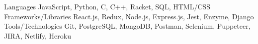 
\begin{cvskills}
  \cvskill
    {Languages} %
    {JavaScript, Python, C, C++, Racket, SQL, HTML/CSS} %
  \cvskill
    {Frameworks/Libraries} %
    {React.js, Redux, Node.js, Express.js, Jest, Enzyme, Django} %
  \cvskill
    {Tools/Technologies} %
    {Git, PostgreSQL, MongoDB, Postman, Selenium, Puppeteer, JIRA, Netlify, Heroku} %
\end{cvskills}
